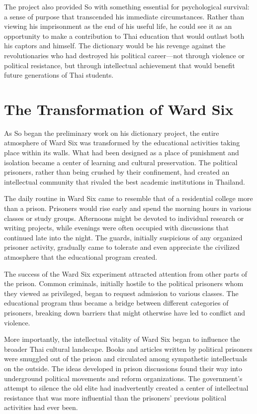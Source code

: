 \documentclass[
  Letterpaper,
]{scrbook}
\begin{document}
The project also provided So with something essential for psychological
survival: a sense of purpose that transcended his immediate
circumstances. Rather than viewing his imprisonment as the end of his
useful life, he could see it as an opportunity to make a contribution to
Thai education that would outlast both his captors and himself. The
dictionary would be his revenge against the revolutionaries who had
destroyed his political career---not through violence or political
resistance, but through intellectual achievement that would benefit
future generations of Thai students.

\section{The Transformation of Ward
Six}\label{the-transformation-of-ward-six}

As So began the preliminary work on his dictionary project, the entire
atmosphere of Ward Six was transformed by the educational activities
taking place within its walls. What had been designed as a place of
punishment and isolation became a center of learning and cultural
preservation. The political prisoners, rather than being crushed by
their confinement, had created an intellectual community that rivaled
the best academic institutions in Thailand.

The daily routine in Ward Six came to resemble that of a residential
college more than a prison. Prisoners would rise early and spend the
morning hours in various classes or study groups. Afternoons might be
devoted to individual research or writing projects, while evenings were
often occupied with discussions that continued late into the night. The
guards, initially suspicious of any organized prisoner activity,
gradually came to tolerate and even appreciate the civilized atmosphere
that the educational program created.

The success of the Ward Six experiment attracted attention from other
parts of the prison. Common criminals, initially hostile to the
political prisoners whom they viewed as privileged, began to request
admission to various classes. The educational program thus became a
bridge between different categories of prisoners, breaking down barriers
that might otherwise have led to conflict and violence.

More importantly, the intellectual vitality of Ward Six began to
influence the broader Thai cultural landscape. Books and articles
written by political prisoners were smuggled out of the prison and
circulated among sympathetic intellectuals on the outside. The ideas
developed in prison discussions found their way into underground
political movements and reform organizations. The government's attempt
to silence the old elite had inadvertently created a center of
intellectual resistance that was more influential than the prisoners'
previous political activities had ever been.
\end{document}
